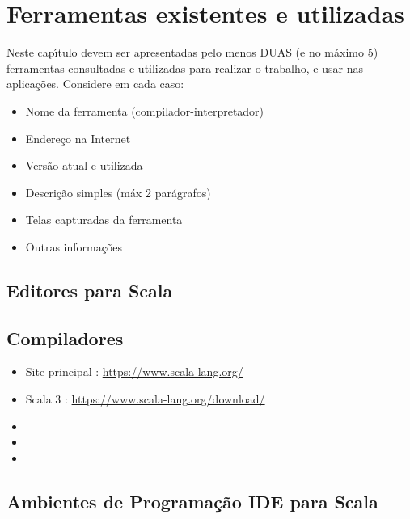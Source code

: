 


\chapter{Ferramentas existentes e utilizadas}

Neste cap\'{\i}tulo devem ser apresentadas pelo menos DUAS (e no m\'{a}ximo 5) ferramentas consultadas e utilizadas para realizar o trabalho, e usar nas aplica\c{c}\~{o}es. Considere em cada caso:
\begin{itemize}
  \item Nome da ferramenta (compilador-interpretador)
  \item Endere\c{c}o na Internet
  \item Vers\~{a}o atual e utilizada
  \item Descri\c{c}\~{a}o simples (m\'{a}x 2 par\'{a}grafos)
  \item Telas capturadas da ferramenta
  \item Outras informa\c{c}\~{o}es
\end{itemize}


    \section{Editores para Scala}


    \section{Compiladores}
            \begin{itemize}
              \item Site principal : \url{https://www.scala-lang.org/}
              \item Scala 3 : \url{https://www.scala-lang.org/download/}
              \item
              \item
              \item
            \end{itemize}



    \section{Ambientes de Programa\c{c}\~{a}o IDE para Scala}
